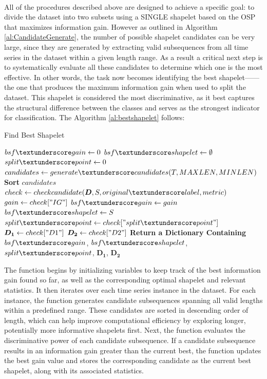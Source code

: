 \\
All of the procedures described above are designed to achieve a specific goal: to divide the dataset into two subsets using a SINGLE shapelet based on the OSP that maximizes information gain. However as outlined in Algorithm \ref{al:CandidateGenerate}, the number of possible shapelet candidates can be very large, since they are generated by extracting valid subsequences from all time series in the dataset within a given length range. As a result a critical next step is to systematically evaluate all these candidates to determine which one is the most effective. In other words, the task now becomes identifying the best shapelet——the one that produces the maximum information gain when used to split the dataset. This shapelet is considered the most discriminative, as it best captures the structural difference between the classes and serves as the strongest indicator for classification. The Algorithm \ref{al:bestshapelet} follows:
 \begin{algorithm}[H]
 	\caption{Find Best Shapelet}
 	\begin{algorithmic}[1]{
 			\State $bsf \textunderscore gain \gets 0$
 			\State $bsf \textunderscore shapelet \gets \emptyset$
 			\State $split \textunderscore point \gets 0$
 				\State $candidates \gets generate\textunderscore candidates(T, MAXLEN, MINLEN)$
 				\State \textbf{Sort} $candidates$
 					\State $check \gets checkcandidate(\boldsymbol{D}, S, original\textunderscore label, metric)$
 					\State $gain \gets check["IG"]$
 						\State $bsf \textunderscore gain \gets gain$
 						\State $bsf \textunderscore shapelet \gets S$
 						\State $split \textunderscore point \gets check["split\textunderscore point"]$
 						\State $\boldsymbol{D_1} \gets check["D1"]$
 						\State $\boldsymbol{D_2} \gets check["D2"]$
 					\EndIf
 				\EndFor
 			\EndFor	
 			\State \textbf{Return a Dictionary Containing} $bsf \textunderscore gain$, $bsf \textunderscore shapelet$, $split \textunderscore point$, $\boldsymbol{D_1}$, $\boldsymbol{D_2}$
 			\EndProcedure
 		}
	\end{algorithmic}
	\label{al:bestshapelet}
\end{algorithm}
\noindent The function begins by initializing variables to keep track of the best information gain found so far, as well as the corresponding optimal shapelet and relevant statistics. It then iterates over each time series instance in the dataset. For each instance, the function generates candidate subsequences spanning all valid lengths within a predefined range. These candidates are sorted in descending order of length, which can help improve computational efficiency by exploring longer, potentially more informative shapelets first. Next, the function evaluates the discriminative power of each candidate subsequence. If a candidate subsequence results in an information gain greater than the current best, the function updates the best gain value and stores the corresponding candidate as the current best shapelet, along with its associated statistics.\\
